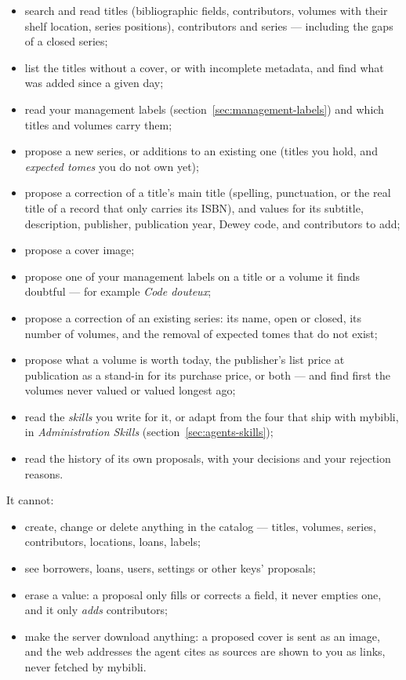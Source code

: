 \begin{itemize}
  \item search and read titles (bibliographic fields, contributors,
        volumes with their shelf location, series positions),
        contributors and series --- including the gaps of a closed
        series;
  \item list the titles without a cover, or with incomplete metadata,
        and find what was added since a given day;
  \item read your management labels (section~\ref{sec:management-labels})
        and which titles and volumes carry them;
  \item propose a new series, or additions to an existing one (titles
        you hold, and \emph{expected tomes} you do not own yet);
  \item propose a correction of a title's main title (spelling,
        punctuation, or the real title of a record that only carries
        its ISBN), and values for its subtitle, description,
        publisher, publication year, Dewey code, and contributors to
        add;
  \item propose a cover image;
  \item propose one of your management labels on a title or a volume
        it finds doubtful --- for example \emph{Code douteux};
  \item propose a correction of an existing series: its name, open or
        closed, its number of volumes, and the removal of expected
        tomes that do not exist;
  \item propose what a volume is worth today, the publisher's list
        price at publication as a stand-in for its purchase price, or
        both --- and find first the volumes never valued or valued
        longest ago;
  \item read the \emph{skills} you write for it, or adapt from the
        four that ship with mybibli, in
        \emph{Administration \textrightarrow{} Skills}
        (section~\ref{sec:agents-skills});
  \item read the history of its own proposals, with your decisions
        and your rejection reasons.
\end{itemize}

It cannot:

\begin{itemize}
  \item create, change or delete anything in the catalog --- titles,
        volumes, series, contributors, locations, loans, labels;
  \item see borrowers, loans, users, settings or other keys'
        proposals;
  \item erase a value: a proposal only fills or corrects a field, it
        never empties one, and it only \emph{adds} contributors;
  \item make the server download anything: a proposed cover is sent
        as an image, and the web addresses the agent cites as
        sources are shown to you as links, never fetched by mybibli.
\end{itemize}

